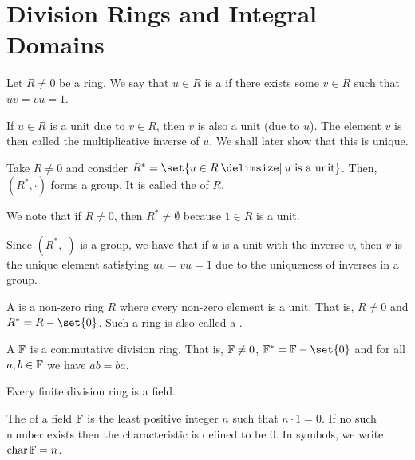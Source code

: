 \documentclass[11pt]{penrose}
\DeclareMathOperator{\charac}{char}
\begin{document}
\section{Division Rings and Integral Domains}
\begin{ndfn}
    Let $R \neq 0$ be a ring. We say that $u \in R$ is a  if there exists some $v \in R$ such that $uv = vu = 1$.
\end{ndfn}

\begin{remark}
    If $u \in R$ is a unit due to $v \in R$, then $v$ is also a unit (due to $u$). The element $v$ is then called the multiplicative inverse of $u$. We shall later show that this is unique.
\end{remark}

\begin{nthm}
    Take $R \neq 0$ and consider $R^* = \set{u \in R \st u \text{ is a unit}}$. Then, $(R^*, \cdot)$ forms a group. It is called the  of $R$.
\end{nthm}

\begin{remark}
    We note that if $R \neq 0$, then $R^* \neq \emptyset$ because $1 \in R$ is a unit.

    Since $(R^*, \cdot)$ is a group, we have that if $u$ is a unit with the inverse $v$, then $v$ is the unique element satisfying $uv = vu = 1$ due to the uniqueness of inverses in a group.
\end{remark}

\begin{ndfn}
    A  is a non-zero ring $R$ where every non-zero element is a unit. That is, $R \neq 0$ and $R^* = R - \set{0}$. Such a ring is also called a .
\end{ndfn}

\begin{ndfn}
    A  $\mathbb{F}$ is a commutative division ring. That is, $\mathbb{F} \neq 0$, $\F^* = \F - \set{0}$ and for all $a, b \in \mathbb{F}$ we have $ab = ba$.
\end{ndfn}

\begin{nthm}
    Every finite division ring is a field.
\end{nthm}

\begin{ndfn}
    The  of a field $\mathbb{F}$ is the least positive integer $n$ such that $n \cdot 1 = 0$. If no such number exists then the characteristic is defined to be $0$. In symbols, we write $\charac \F = n$.
\end{ndfn}
\end{document}
